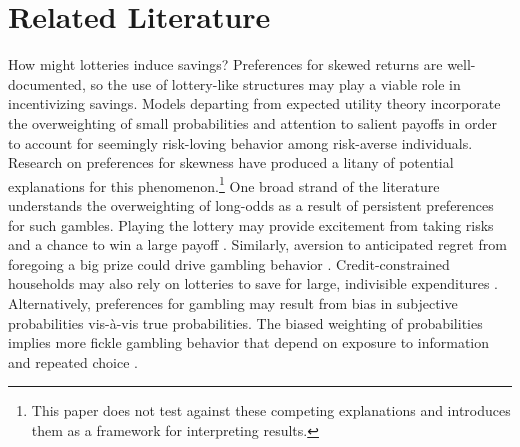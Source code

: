 \documentclass[12pt]{article}
\begin{document}
\section{Related Literature} \label{sec:litreview}

	How might lotteries induce savings? Preferences for skewed returns are well-documented, so the use of lottery-like structures may play a viable role in incentivizing savings. Models departing from expected utility theory incorporate the overweighting of small probabilities  and attention to salient payoffs  in order to account for seemingly risk-loving behavior among risk-averse individuals. Research on preferences for skewness have produced a litany of potential explanations for this phenomenon.\footnote{This paper does not test against these competing explanations and introduces them as a framework for interpreting results.} One broad strand of the literature understands the overweighting of long-odds as a result of persistent preferences for such gambles. Playing the lottery may provide excitement from taking risks and a chance to win a large payoff . Similarly, aversion to anticipated regret from foregoing a big prize could drive gambling behavior . Credit-constrained households may also rely on lotteries to save for large, indivisible expenditures . Alternatively, preferences for gambling may result from bias in subjective probabilities vis-\`{a}-vis true probabilities. The biased weighting of probabilities implies more fickle gambling behavior that depend on exposure to information and repeated choice .

\end{document}
